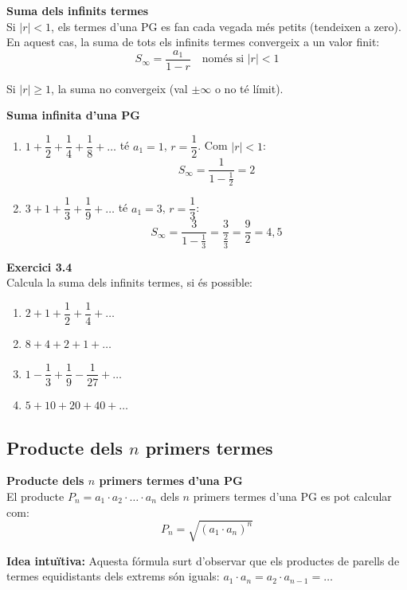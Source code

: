 \documentclass[12pt]{article}
\begin{document}
\begin{concept}
\textbf{Suma dels infinits termes}\\
Si $|r| < 1$, els termes d'una PG es fan cada vegada més petits (tendeixen a zero). En aquest cas, la suma de tots els infinits termes convergeix a un valor finit:
\[
\boxed{S_\infty = \dfrac{a_1}{1 - r} \quad \text{només si } |r| < 1}
\]

Si $|r| \ge 1$, la suma no convergeix (val $\pm\infty$ o no té límit).
\end{concept}

\begin{exemple}
\textbf{Suma infinita d'una PG}
\begin{enumerate}[label=\alph*)]
    \item $1 + \dfrac{1}{2} + \dfrac{1}{4} + \dfrac{1}{8} + \dots$ té $a_1 = 1$, $r = \dfrac{1}{2}$. Com $|r|<1$:
    \[
    S_\infty = \dfrac{1}{1 - \frac{1}{2}} = 2
    \]
    \item $3 + 1 + \dfrac{1}{3} + \dfrac{1}{9} + \dots$ té $a_1 = 3$, $r = \dfrac{1}{3}$:
    \[
    S_\infty = \dfrac{3}{1 - \frac{1}{3}} = \dfrac{3}{\frac{2}{3}} = \dfrac{9}{2} = 4{,}5
    \]
\end{enumerate}
\end{exemple}

\begin{exercici}
\textbf{Exercici 3.4}\\
Calcula la suma dels infinits termes, si és possible:
\begin{enumerate}[label=\alph*)]
    \item $2 + 1 + \dfrac{1}{2} + \dfrac{1}{4} + \dots$
    \item $8 + 4 + 2 + 1 + \dots$
    \item $1 - \dfrac{1}{3} + \dfrac{1}{9} - \dfrac{1}{27} + \dots$
    \item $5 + 10 + 20 + 40 + \dots$
\end{enumerate}
\end{exercici}

\subsection{Producte dels $n$ primers termes}

\begin{concept}
\textbf{Producte dels $n$ primers termes d'una PG}\\
El producte $P_n = a_1 \cdot a_2 \cdot \dots \cdot a_n$ dels $n$ primers termes d'una PG es pot calcular com:
\[
\boxed{P_n = \sqrt{(a_1 \cdot a_n)^n}}
\]

\textbf{Idea intuïtiva:} Aquesta fórmula surt d'observar que els productes de parells de termes equidistants dels extrems són iguals: $a_1 \cdot a_n = a_2 \cdot a_{n-1} = \dots$
\end{concept}
\end{document}
